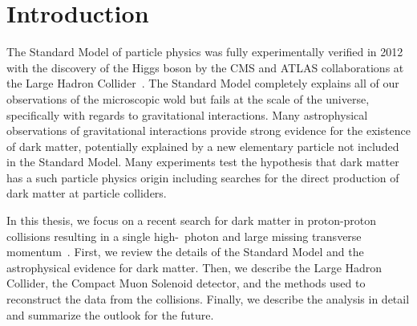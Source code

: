 \chapter{Introduction}

The Standard Model of particle physics was fully experimentally verified in 2012 with the discovery of the Higgs boson by the CMS and ATLAS collaborations at the Large Hadron Collider~\cite{HiggsPaper}.
The Standard Model completely explains all of our observations of the microscopic wold but fails at the scale of the universe, specifically with regards to gravitational interactions.
Many astrophysical observations of gravitational interactions provide strong evidence for the existence of dark matter, potentially explained by a new elementary particle not included in the Standard Model.
Many experiments test the hypothesis that dark matter has a such particle physics origin including searches for the direct production of dark matter at particle colliders.

In this thesis, we focus on a recent search for dark matter in proton-proton collisions resulting in a single high-\pt\ photon and large missing transverse momentum~\cite{Monophoton}.
First, we review the details of the Standard Model and the astrophysical evidence for dark matter.
Then, we describe the Large Hadron Collider, the Compact Muon Solenoid detector, and the methods used to reconstruct the data from the collisions.
Finally, we describe the analysis in detail and summarize the outlook for the future.

